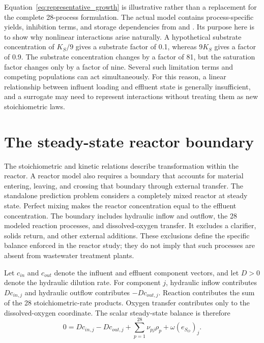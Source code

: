 Equation~\eqref{eq:representative_growth} is illustrative rather than a replacement for the complete 28-process formulation. The actual model contains process-specific yields, inhibition terms, and storage dependencies from \citet{Henze2006} and \citet{Guerrero2011}. Its purpose here is to show why nonlinear interactions arise naturally. A hypothetical substrate concentration of $K_S/9$ gives a substrate factor of 0.1, whereas $9K_S$ gives a factor of 0.9. The substrate concentration changes by a factor of 81, but the saturation factor changes only by a factor of nine. Several such limitation terms and competing populations can act simultaneously. For this reason, a linear relationship between influent loading and effluent state is generally insufficient, and a surrogate may need to represent interactions without treating them as new stoichiometric laws.

\section{The steady-state reactor boundary}

The stoichiometric and kinetic relations describe transformation within the reactor. A reactor model also requires a boundary that accounts for material entering, leaving, and crossing that boundary through external transfer. The standalone prediction problem considers a completely mixed reactor at steady state. Perfect mixing makes the reactor concentration equal to the effluent concentration. The boundary includes hydraulic inflow and outflow, the 28 modeled reaction processes, and dissolved-oxygen transfer. It excludes a clarifier, solids return, and other external additions. These exclusions define the specific balance enforced in the reactor study; they do not imply that such processes are absent from wastewater treatment plants.

Let $c_{in}$ and $c_{out}$ denote the influent and effluent component vectors, and let $D>0$ denote the hydraulic dilution rate. For component $j$, hydraulic inflow contributes $Dc_{in,j}$ and hydraulic outflow contributes $-Dc_{out,j}$. Reaction contributes the sum of the 28 stoichiometric-rate products. Oxygen transfer contributes only to the dissolved-oxygen coordinate. The scalar steady-state balance is therefore
\[
0=Dc_{in,j}-Dc_{out,j}
+\sum_{p=1}^{28}\nu_{pj}\rho_p+\omega(e_{S_O})_j.
\]

